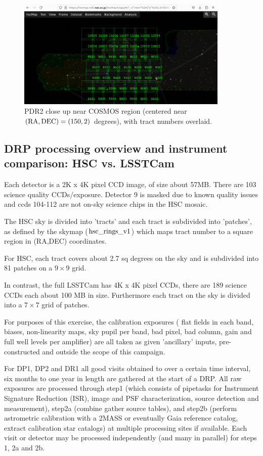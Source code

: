  \begin{figure}[h]
 \includegraphics[width=0.9\textwidth]{hscmaptractcosmos.png}
	 \caption{PDR2 close up near COSMOS region (centered near $\rm (RA,DEC) = (150, 2)$ degrees), with tract numbers overlaid.  \label{fig:hscmaptract}}
 \end{figure}

\subsection{DRP processing overview and instrument comparison: HSC vs. LSSTCam}

Each detector is a 2K x 4K pixel CCD image, of size about 57MB.
There are 103 science quality CCDs/exposure.  Detector 9 is masked due
to known quality issues and ccds 104-112 are not on-sky science chips in
the HSC mosaic.

The HSC sky is divided into 'tracts' and each tract is subdivided 
into 'patches', as defined by the skymap ($\rm hsc\_rings\_v1$) which maps 
tract number to a square region in (RA,DEC) coordinates.

For HSC, each tract covers about 2.7 sq degrees on the sky and is
subdivided into 81 patches on a $9 \times 9$ grid.

In contrast, the full LSSTCam has 4K x 4K pixel CCDs, there are 
189 science CCDs each about 100 MB in size.  Furthermore each tract 
on the sky is divided into a $7\times 7$ grid of patches.

For purposes of this exercise, the calibration exposures (
flat fields in each band, biases, non-linearity maps, sky pupil per 
band, bad pixel, bad column,  gain and full well levels per amplifier) are 
all taken as given 'ancillary' inputs, pre-constructed and outside the
scope of this campaign.

For DP1, DP2 and DR1 all good visits obtained to over a certain time
interval, six months to one year in length are gathered at the
start of a DRP.  All raw exposures are processed through 
step1 (which consists of pipetasks for Instrument Signature 
Reduction (ISR), image and PSF characterization, source detection 
and measurement), 
step2a (combine gather source tables), and step2b (perform 
astrometric calibration with a 2MASS or eventually Gaia reference catalog,
extract calibration star catalogs) 
at multiple processing sites if available.  Each visit or detector may 
be processed independently (and many in parallel) 
for steps 1, 2a and 2b.

